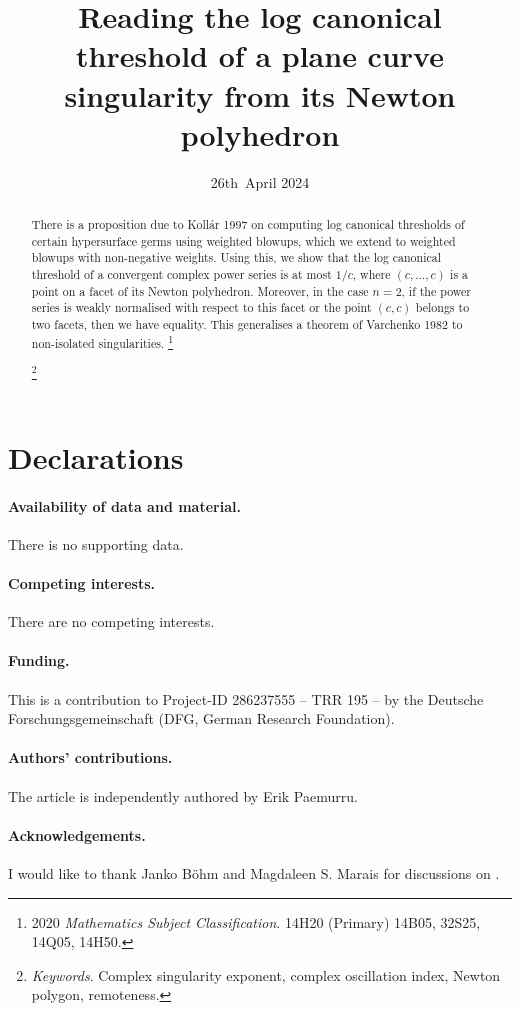 \documentclass[a4paper, 12pt, oneside]{article}
\title{Reading the log canonical threshold of a plane curve singularity from its Newton polyhedron}
\author{\ShowAuthors{, }{, }}
\date{26th~April 2024}
\theoremstyle{plain}
\theoremstyle{definition}
\theoremstyle{remark}
\numberwithin{theorem}{section}
\numberwithin{table}{section}
\numberwithin{equation}{theorem}
\newcommand\blfootnote[1]
  {%
    \begingroup%
      \renewcommand\thefootnote{}%
      \footnote{#1}%
      \addtocounter{footnote}{-1}%
    \endgroup%
  }
\newcommand\keywords{Complex singularity exponent, complex oscillation index, Newton polygon, remoteness}
\newcommand\subjclass{14H20 (Primary) 14B05, 32S25, 14Q05, 14H50}
\begin{document}
\maketitle

\begin{abstract}
There is a proposition due to Kollár 1997 on computing log canonical thresholds of certain hypersurface germs using weighted blowups, which we extend to weighted blowups with non-negative weights. Using this, we show that the log canonical threshold of a convergent complex power series is at most $1/c$, where $(c, \ldots, c)$ is a point on a facet of its Newton polyhedron. Moreover, in the case $n = 2$, if the power series is weakly normalised with respect to this facet or the point $(c, c)$ belongs to two facets, then we have equality. This generalises a theorem of Varchenko 1982 to non-isolated singularities.
\blfootnote{\textup{2020} \textit{Mathematics Subject Classification}. \subjclass{}.}
\blfootnote{\textit{Keywords}. \keywords{}.}
\end{abstract}

\tableofcontents

\section*{Declarations}

\paragraph{Availability of data and material.} There is no supporting data.

\paragraph{Competing interests.} There are no competing interests.

\paragraph{Funding.} This is a contribution to Project-ID 286237555 -- TRR 195 -- by the Deutsche Forschungsgemeinschaft (DFG, German Research Foundation).

\paragraph{Authors' contributions.} The article is independently authored by Erik Paemurru.

\paragraph{Acknowledgements.} I would like to thank Janko Böhm and Magdaleen S. Marais for discussions on \cite{BMP20}.
\end{document}
